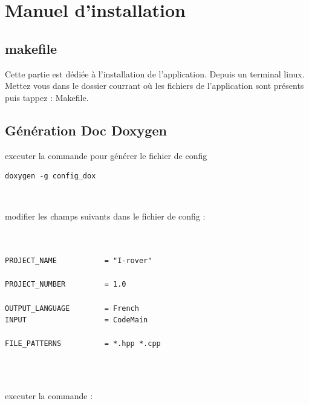 \documentclass[a4paper 12pts]{article}
\newenvironment{DDbox}[1]{
\begin{lrbox}{\BBbox}\begin{minipage}{\linewidth}}
{\end{minipage}\end{lrbox}\noindent\colorbox{Zgris}{\usebox{\BBbox}} \\
[.5cm]}
\begin{document}
\newpage

\section{Manuel d'installation}

\vspace{1.5cm}


\subsection{makefile}


Cette partie est dédiée à l'installation de l'application.
Depuis un terminal linux.
Mettez vous dans le dossier courrant où les fichiers de l'application sont présents puis tappez :
Makefile.


\subsection{Génération Doc Doxygen}

executer la commande pour générer le fichier de config

\vspace{0.5 cm}
\begin{DDbox}{\linewidth}
\begin{verbatim}
doxygen -g config_dox
\end{verbatim}
\end{DDbox}


modifier les champs suivants dans le fichier de config :

\vspace{0.3 cm}


\begin{DDbox}{\linewidth}
\begin{verbatim}


PROJECT_NAME           = "I-rover"

PROJECT_NUMBER         = 1.0

OUTPUT_LANGUAGE        = French
INPUT                  = CodeMain

FILE_PATTERNS          = *.hpp *.cpp


\end{verbatim}
\end{DDbox}


executer la commande :

\vspace{0.3 cm}
\end{document}
